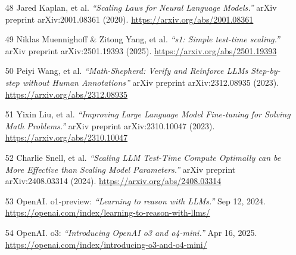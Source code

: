 \documentclass[12pt]{article}
\begin{document}
\begin{itemize}
    \item [48] Jared Kaplan, et al. \textit{``Scaling Laws for Neural Language Models.''} arXiv preprint arXiv:2001.08361 (2020). \url{https://arxiv.org/abs/2001.08361}
    \item [49] Niklas Muennighoff \& Zitong Yang, et al. \textit{``s1: Simple test-time scaling.''} arXiv preprint arXiv:2501.19393 (2025). \url{https://arxiv.org/abs/2501.19393}
    \item [50] Peiyi Wang, et al. \textit{``Math-Shepherd: Verify and Reinforce LLMs Step-by-step without Human Annotations''} arXiv preprint arXiv:2312.08935 (2023). \url{https://arxiv.org/abs/2312.08935}
    \item [51] Yixin Liu, et al. \textit{``Improving Large Language Model Fine-tuning for Solving Math Problems.''} arXiv preprint arXiv:2310.10047 (2023). \url{https://arxiv.org/abs/2310.10047}
    \item [52] Charlie Snell, et al. \textit{``Scaling LLM Test-Time Compute Optimally can be More Effective than Scaling Model Parameters.''} arXiv preprint arXiv:2408.03314 (2024). \url{https://arxiv.org/abs/2408.03314}
    \item [53] OpenAI. o1-preview: \textit{``Learning to reason with LLMs.''} Sep 12, 2024. \url{https://openai.com/index/learning-to-reason-with-llms/}
    \item [54] OpenAI. o3: \textit{``Introducing OpenAI o3 and o4-mini.''} Apr 16, 2025. \url{https://openai.com/index/introducing-o3-and-o4-mini/}
\end{itemize}
\end{document}
